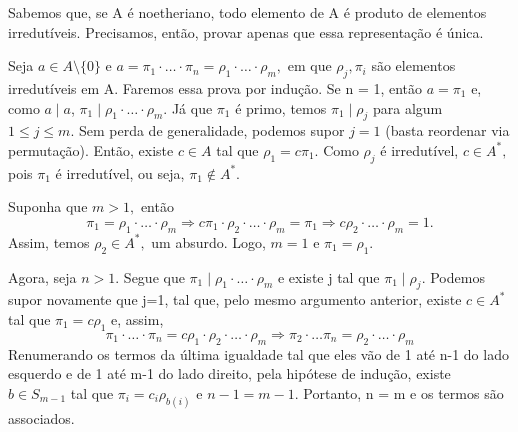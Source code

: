 \documentclass[AlgebraII/algebraII_notes.tex]{subfiles}
\begin{document}
\begin{proof*}
	Sabemos que, se A é noetheriano, todo elemento de A é produto de elementos irredutíveis. Precisamos, então, provar apenas que essa representação é única.

	Seja \(a\in A\setminus{\{0\}}\) e \(a = \pi_{1}\cdot \dotsc \cdot \pi_{n} = \rho_{1}\cdot \dotsc \cdot \rho_{m},\) em que \(\rho_{j}, \pi_{i}\) são elementos
	irredutíveis em A. Faremos essa prova por indução. Se n = 1, então \(a = \pi_{1}\) e, como \(a\mid a\), \(\pi_{1}\mid\rho_{1}\cdot \dotsc \cdot \rho_{m}\). Já que
	\(\pi_{1}\) é primo, temos \(\pi_{1}\mid\rho_{j}\) para algum \(1\leq j\leq m.\) Sem perda de generalidade, podemos supor \(j=1\) (basta reordenar via permutação). Então, existe \(c\in A\) tal que \(\rho _{1} = c\pi_{1}.\) Como \(\rho_{j}\) é irredutível,
	\(c\in A^{*},\) pois \(\pi_{1}\) é irredutível, ou seja, \(\pi_{1}\not\in A^{*}\).

	Suponha que \(m > 1,\) então
	\[
		\pi_{1} = \rho_{1}\cdot \dotsc \cdot \rho_{m} \Rightarrow c\pi_{1}\cdot \rho_{2}\cdot \dotsc \cdot \rho_{m} = \pi_{1} \Rightarrow c\rho_{2} \cdot \dotsc \cdot \rho_{m} = 1.
	\]
	Assim, temos \(\rho_{2}\in A^{*},\) um absurdo. Logo, \(m=1\) e \(\pi_{1} = \rho_{1}\).

	Agora, seja \(n > 1\). Segue que \(\pi_{1}\mid \rho_{1}\cdot \dotsc \cdot \rho_{m}\) e existe j tal que \(\pi_{1}\mid\rho_{j}.\) Podemos supor novamente
	que j=1, tal que, pelo mesmo argumento anterior, existe \(c\in A^{*}\) tal que \(\pi_{1} = c\rho_{1}\) e, assim,
	\[
		\pi_{1}\cdot \dotsc \cdot \pi_{n} = c\rho_{1}\cdot \rho_{2} \cdot \dotsc \cdot \rho_{m} \Rightarrow \pi_{2}\cdot \dotsc \pi_{n} = \rho_{2}\cdot \dotsc \cdot \rho_{m}
	\]
	Renumerando os termos da última igualdade tal que eles vão de 1 até n-1 do lado esquerdo e de 1 até m-1 do lado direito, pela hipótese de indução, existe \(b\in S_{m-1}\)
	tal que \(\pi_{i} = c_{i}\rho_{b(i)}\) e \(n-1 = m-1.\) Portanto, n = m e os termos são associados. \qedsymbol
\end{proof*}
\end{document}
